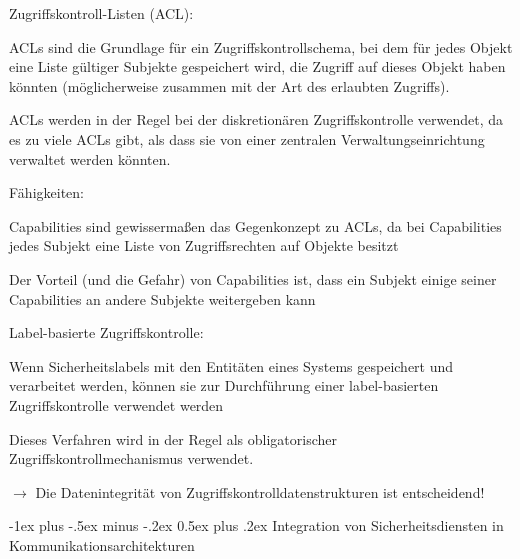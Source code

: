 \documentclass[a4paper]{article}
\makeatletter
\renewcommand{\section}{\@startsection{section}{1}{0mm}%
 {-1ex plus -.5ex minus -.2ex}%
 {0.5ex plus .2ex}%
 {\normalfont\large\bfseries}}
\makeatother
\begin{document}
\begin{multicols}{3}
      \begin{itemize*}
            \item Zugriffskontroll-Listen (ACL):
            \begin{itemize*}
                  \item ACLs sind die Grundlage für ein Zugriffskontrollschema, bei dem für jedes Objekt eine Liste gültiger Subjekte gespeichert wird, die Zugriff auf dieses Objekt haben könnten (möglicherweise zusammen mit der Art des erlaubten Zugriffs).
                  \item ACLs werden in der Regel bei der diskretionären Zugriffskontrolle verwendet, da es zu viele ACLs gibt, als dass sie von einer zentralen Verwaltungseinrichtung verwaltet werden könnten.
            \end{itemize*}
            \item Fähigkeiten:
            \begin{itemize*}
                  \item Capabilities sind gewissermaßen das Gegenkonzept zu ACLs, da bei Capabilities jedes Subjekt eine Liste von Zugriffsrechten auf Objekte besitzt
                  \item Der Vorteil (und die Gefahr) von Capabilities ist, dass ein Subjekt einige seiner Capabilities an andere Subjekte weitergeben kann
            \end{itemize*}
            \item Label-basierte Zugriffskontrolle:
            \begin{itemize*}
                  \item Wenn Sicherheitslabels mit den Entitäten eines Systems gespeichert und verarbeitet werden, können sie zur Durchführung einer label-basierten Zugriffskontrolle verwendet werden
                  \item Dieses Verfahren wird in der Regel als obligatorischer Zugriffskontrollmechanismus verwendet.
            \end{itemize*}
            \item $\rightarrow$ Die Datenintegrität von
            Zugriffskontrolldatenstrukturen ist entscheidend!
      \end{itemize*}


      \section{Integration von Sicherheitsdiensten in
        Kommunikationsarchitekturen}



\end{multicols}
\end{document}
